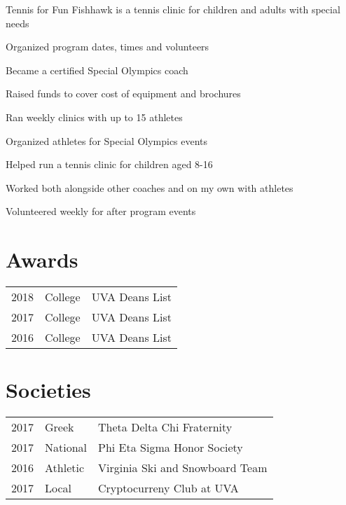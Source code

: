 \documentclass[]{deedy-resume-openfont}
\begin{document}
\begin{minipage}[t]{0.66\textwidth}
\begin{tightemize}
\item 	Tennis for Fun Fishhawk is a tennis clinic for children and adults with special needs\item 	Organized program dates, times and volunteers \item Became a certified Special Olympics coach \item	Raised funds to cover cost of equipment and brochures \item  Ran weekly clinics with up to 15 athletes \item Organized athletes for Special Olympics events  \end{tightemize}
\sectionsep

\begin{tightemize}
\item 	Helped run a tennis clinic for children aged 8-16 \item Worked both alongside other coaches and on my own with athletes \item Volunteered weekly for after program events  \end{tightemize}
\sectionsep




\section{Awards} 
\begin{tabular}{rll}
2018 & College & UVA Deans List \\
2017 & College & UVA Deans List \\
2016 & College & UVA Deans List \\

\end{tabular}
\sectionsep


\section{Societies} 

\begin{tabular}{rll}
2017 	& Greek    & Theta Delta Chi Fraternity\\
2017   & National   & Phi Eta Sigma Honor Society\\
2016  & Athletic    & Virginia Ski and Snowboard Team \\
2017   & Local  &    Cryptocurreny Club at UVA
\end{tabular}
\sectionsep

\end{minipage} 
\end{document}
